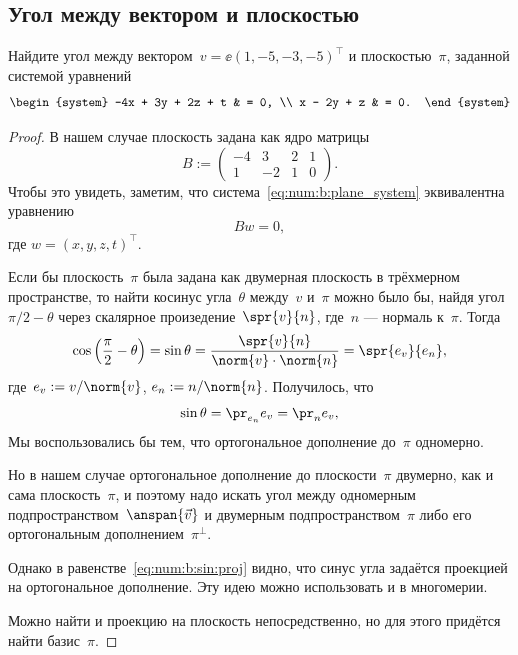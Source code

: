 \subsection{Угол между вектором и плоскостью}

Найдите угол между вектором~$v=\ee(1, -5, -3, -5)^\top$ и плоскостью~$\pi$, заданной системой уравнений
\begin{equation}
	\label{eq:num:b:plane_system}
	\begin{system}
		-4x + 3y + 2z + t 
		& = 0,
		\\
		x - 2y + z
		& = 0.
	\end{system}
\end{equation}

\begin{proof}
	В нашем случае плоскость задана как ядро матрицы
	\[
		B :=
		\begin{pmatrix}
			-4 & 3 & 2 & 1 \\
			1 & -2 & 1 & 0
		\end{pmatrix}
		.
	\]
	Чтобы это увидеть, заметим, что система~\eqref{eq:num:b:plane_system} эквивалентна уравнению
	\[
		Bw = 0
		,
	\]
	где $w = (x, y, z, t)^\top$.

	Если бы плоскость~$\pi$ была задана как двумерная плоскость в трёхмерном пространстве, то найти косинус угла~$\theta$ между~$v$ и~$\pi$ можно было бы, найдя угол~$\pi/2 - \theta$ через скалярное произедение~$\spr{v}{n}$, где~$n$ --- нормаль к~$\pi$. Тогда
	\[
		\cos
		\left( 
			\frac{\pi}{2} -
			\theta
		\right)
		=
		\sin{\theta}
		=
		\frac{\spr{v}{n}}{\norm{v} \cdot \norm{n}}
		=
		\spr{e_v}{e_n}
		,
	\]
	где~$e_v := v/\norm{v}$, $e_n := n/\norm{n}$. Получилось, что
	\begin{equation}
		\label{eq:num:b:sin:proj}
		\sin{\theta} = \pr_{e_n}{e_v} = \pr_n{e_v}
		,
	\end{equation}
	Мы воспользовались бы тем, что ортогональное дополнение до~$\pi$ одномерно.

	Но в нашем случае ортогональное дополнение до плоскости~$\pi$ двумерно, как и сама плоскость~$\pi$, и поэтому надо искать угол между одномерным подпространством~$\anspan{\vec{v}}$ и двумерным подпространством~$\pi$ либо его ортогональным дополнением~$\pi^{\bot}$.
	
	Однако в равенстве~\eqref{eq:num:b:sin:proj} видно, что синус угла задаётся проекцией на ортогональное дополнение. Эту идею можно использовать и в многомерии.

	Можно найти и проекцию на плоскость непосредственно, но для этого придётся найти базис~$\pi$.


\end{proof}
